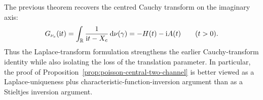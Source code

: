 \begin{remark}
The previous theorem recovers the centred Cauchy transform on the
imaginary axis:
\[
G_{\nu_c}(\mathrm{i} t)
=\int_{\mathbb{R}}\frac{1}{\mathrm{i} t-X_c}\,\mathrm{d}\nu(\gamma)
=-H(t)-\mathrm{i} A(t)
\qquad(t>0).
\]
Thus the Laplace-transform formulation strengthens the earlier
Cauchy-transform identity while also isolating the loss of the translation
parameter.  In particular, the proof of
Proposition~\ref{prop:poisson-central-two-channel} is better viewed as a
Laplace-uniqueness plus characteristic-function-inversion argument than
as a Stieltjes inversion argument.
\end{remark}
